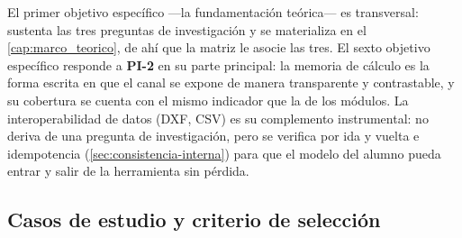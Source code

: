 El primer objetivo específico —la fundamentación teórica— es transversal: sustenta las tres preguntas de investigación y se materializa en el \autoref{cap:marco_teorico}, de ahí que la matriz le asocie las tres. El sexto objetivo específico responde a \textbf{PI-2} en su parte principal: la memoria de cálculo es la forma escrita en que el canal se expone de manera transparente y contrastable, y su cobertura se cuenta con el mismo indicador que la de los módulos. La interoperabilidad de datos (DXF, CSV) es su complemento instrumental: no deriva de una pregunta de investigación, pero se verifica por ida y vuelta e idempotencia (\autoref{sec:consistencia-interna}) para que el modelo del alumno pueda entrar y salir de la herramienta sin pérdida.

\subsection{Casos de estudio y criterio de selección}
\label{sec:poblacion}

